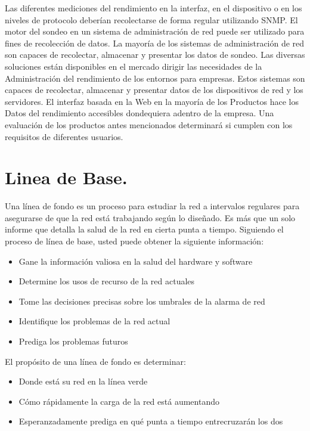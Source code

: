 \noindent
Las diferentes mediciones del rendimiento en la interfaz, en el dispositivo o en los niveles de protocolo deberían recolectarse de forma regular utilizando SNMP. El motor del sondeo en un sistema de administración de red puede ser utilizado para fines de recolección de datos. La mayoría de los sistemas de administración de red son capaces de recolectar, almacenar y presentar los datos de sondeo.
\newline
\newline
Las diversas soluciones están disponibles en el mercado dirigir las necesidades de la Administración del rendimiento de los entornos para empresas. Estos sistemas son capaces de recolectar, almacenar y presentar datos de los dispositivos de red y los servidores. El interfaz basada en la Web en la mayoría de los Productos hace los Datos del rendimiento accesibles dondequiera adentro de la empresa. Una evaluación de los productos antes mencionados determinará si cumplen con los requisitos de diferentes usuarios. \cite{admin_redCisco}
\newline 

\section{Linea de Base.}

\noindent
Una línea de fondo es un proceso para estudiar la red a intervalos regulares para asegurarse de que la red está trabajando según lo diseñado. Es más que un solo informe que detalla la salud de la red en cierta punta a tiempo. Siguiendo el proceso de línea de base, usted puede obtener la siguiente información:
\begin{itemize}
	\item Gane la información valiosa en la salud del hardware y software
	\item Determine los usos de recurso de la red actuales
	\item Tome las decisiones precisas sobre los umbrales de la alarma de red
	\item Identifique los problemas de la red actual
	\item Prediga los problemas futuros
\end{itemize}

\noindent
El propósito de una línea de fondo es determinar: 
\begin{itemize}
	\item Donde está su red en la línea verde
	\item Cómo rápidamente la carga de la red está aumentando
	\item Esperanzadamente prediga en qué punta a tiempo entrecruzarán los dos
\end{itemize}

